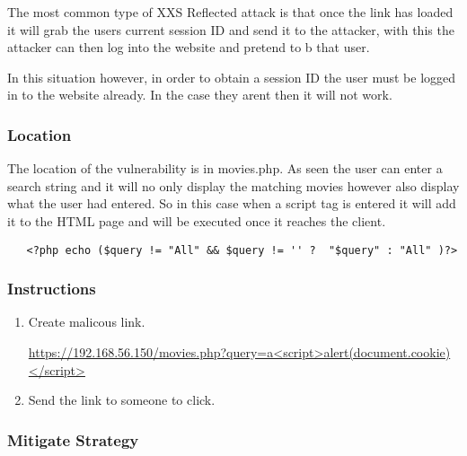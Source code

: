 \documentclass[titlepage]{article}
\begin{document}
      The most common type of XXS Reflected attack is that once the link has loaded it will grab the users current session ID and send it to the attacker, with this the attacker can then log into the website and pretend to b that user. 

      In this situation however, in order to obtain a session ID the user must be logged in to the website already. In the case they arent then it will not work.


      \subsubsection{Location} %
      \label{ssub:xxs_reflected_location}
      
      The location of the vulnerability is in movies.php. As seen the user can enter a search string and it will no only display the matching movies however also display what the user had entered. So in this case when a script tag is entered it will add it to the HTML page and will be executed once it reaches the client. 

   \begin{lstlisting}
   <?php echo ($query != "All" && $query != '' ?  "$query" : "All" )?>
   \end{lstlisting}


      \subsubsection{Instructions} %
      \label{ssub:xxs_reflected_instructions}
      
      \begin{enumerate}
         \item Create malicous link. 
         \begin{itemize}
            \url{https://192.168.56.150/movies.php?query=a<script>alert(document.cookie)</script>}
         \end{itemize}
         \item Send the link to someone to click.
      \end{enumerate}


      \subsubsection{Mitigate Strategy} %
      \label{ssub:xxs_reflected_mitigate_strategy}
\end{document}
